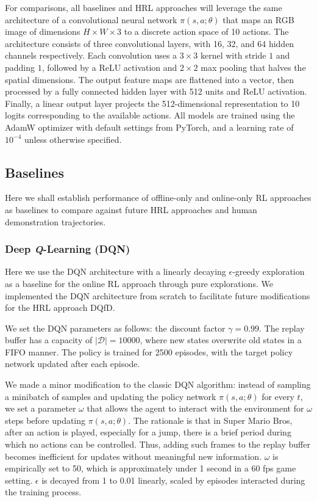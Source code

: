 \documentclass{article}
\begin{document}
For comparisons, all baselines and HRL approaches will leverage the same 
architecture of a convolutional neural network $\pi(s,a;\theta)$ that maps an RGB image of 
dimensions \(H \times W \times 3\) to a discrete action space of 10 actions. 
The architecture consists of three convolutional layers, with 16, 32, and 64 
hidden channels respectively. Each convolution uses a \(3 \times 3\) kernel 
with stride $1$ and padding $1$, followed by a ReLU activation and \(2 \times 
2\) max pooling that halves the spatial dimensions. The output feature maps 
are flattened into a vector, then processed by a fully connected hidden layer 
with 512 units and ReLU activation. Finally, a linear output layer projects 
the 512-dimensional representation to 10 logits corresponding to the available 
actions.
All models are trained using the AdamW optimizer with default settings from 
PyTorch, and a learning rate of $10^{-4}$ unless otherwise specified.

\subsection{Baselines}
Here we shall establish performance of offline-only and online-only RL approaches
as baselines to compare against future HRL approaches and human demonstration trajectories. 

\subsubsection{Deep \textit{Q}-Learning (DQN)}

Here we use the DQN architecture with a linearly decaying $\epsilon$-greedy 
exploration as a baseline for the online RL approach through pure explorations. 
We implemented the DQN architecture from scratch to facilitate future 
modifications for the HRL approach DQfD.

We set the DQN parameters as follows: the discount factor $\gamma=0.99$. The 
replay buffer has a capacity of $|\mathcal{D}|=10000$, where new states 
overwrite old states in a FIFO manner. The policy is trained for 2500 episodes, 
with the target policy network updated after each episode.

We made a minor modification to the classic DQN algorithm: instead of sampling 
a minibatch of samples and updating the policy network $\pi(s,a;\theta)$ for 
every $t$, we set a parameter $\omega$ that allows the agent to interact with 
the environment for $\omega$ steps before updating $\pi(s,a;\theta)$. The 
rationale is that in Super Mario Bros, after an action is played, especially 
for a jump, there is a brief period during which no actions can be controlled. 
Thus, adding such frames to the replay buffer becomes inefficient for updates 
without meaningful new information. $\omega$ is empirically set to 50, which is 
approximately under 1 second in a 60 fps game setting. $\epsilon$ is decayed 
from 1 to 0.01 linearly, scaled by episodes interacted during the training 
process.
\end{document}
